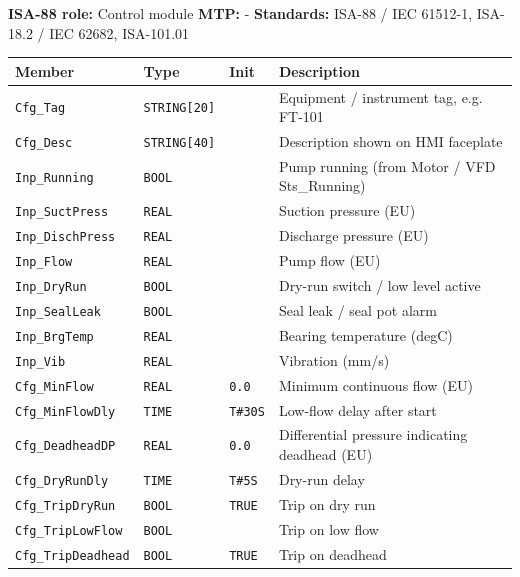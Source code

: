 {\small\textbf{ISA-88 role:} Control module \quad \textbf{MTP:} - \quad \textbf{Standards:} ISA-88 /\allowbreak{} IEC 61512-1, ISA-18.2 /\allowbreak{} IEC 62682, ISA-101.01}
{\footnotesize
\begin{longtable}{@{}>{\raggedright\arraybackslash}p{3.4cm}>{\raggedright\arraybackslash}p{3.3cm}>{\raggedright\arraybackslash}p{1.3cm}>{\raggedright\arraybackslash}p{6.4cm}@{}}
\toprule
\rowcolor{tblhead}\textbf{Member} & \textbf{Type} & \textbf{Init} & \textbf{Description} \\
\midrule
\endhead
\texttt{Cfg\_Tag} & \texttt{STRING[20]} &  & Equipment /\allowbreak{} instrument tag, e.g. FT-101 \\
\texttt{Cfg\_Desc} & \texttt{STRING[40]} &  & Description shown on HMI faceplate \\
\texttt{Inp\_Running} & \texttt{BOOL} &  & Pump running (from Motor /\allowbreak{} VFD Sts\_Running) \\
\texttt{Inp\_SuctPress} & \texttt{REAL} &  & Suction pressure (EU) \\
\texttt{Inp\_DischPress} & \texttt{REAL} &  & Discharge pressure (EU) \\
\texttt{Inp\_Flow} & \texttt{REAL} &  & Pump flow (EU) \\
\texttt{Inp\_DryRun} & \texttt{BOOL} &  & Dry-run switch /\allowbreak{} low level active \\
\texttt{Inp\_SealLeak} & \texttt{BOOL} &  & Seal leak /\allowbreak{} seal pot alarm \\
\texttt{Inp\_BrgTemp} & \texttt{REAL} &  & Bearing temperature (degC) \\
\texttt{Inp\_Vib} & \texttt{REAL} &  & Vibration (mm/\allowbreak{}s) \\
\texttt{Cfg\_MinFlow} & \texttt{REAL} & \texttt{0.0} & Minimum continuous flow (EU) \\
\texttt{Cfg\_MinFlowDly} & \texttt{TIME} & \texttt{T\#30S} & Low-flow delay after start \\
\texttt{Cfg\_DeadheadDP} & \texttt{REAL} & \texttt{0.0} & Differential pressure indicating deadhead (EU) \\
\texttt{Cfg\_DryRunDly} & \texttt{TIME} & \texttt{T\#5S} & Dry-run delay \\
\texttt{Cfg\_TripDryRun} & \texttt{BOOL} & \texttt{TRUE} & Trip on dry run \\
\texttt{Cfg\_TripLowFlow} & \texttt{BOOL} &  & Trip on low flow \\
\texttt{Cfg\_TripDeadhead} & \texttt{BOOL} & \texttt{TRUE} & Trip on deadhead \\

\end{longtable}}
